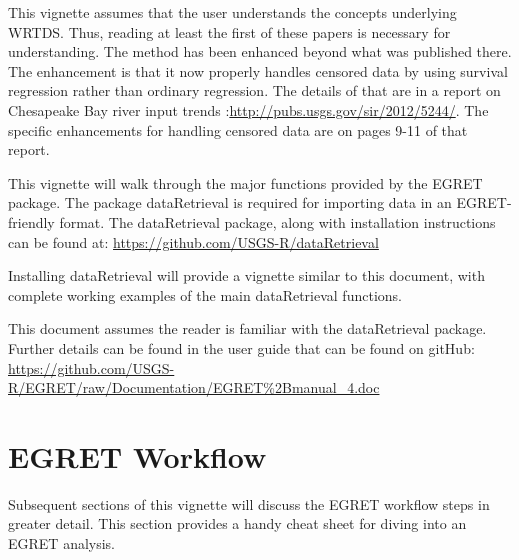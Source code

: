 \documentclass[a4paper,11pt]{article}\usepackage{graphicx, color}
\begin{document}
This vignette assumes that the user understands the concepts underlying WRTDS.  Thus, reading at least the first of these papers is necessary for understanding.  The method has been enhanced beyond what was published there.  The enhancement is that it now properly handles censored data by using survival regression rather than ordinary regression.  The details of that are in a report on Chesapeake Bay river input trends \cite{HirschIV}:\url{http://pubs.usgs.gov/sir/2012/5244/}.  The specific enhancements for handling censored data are on pages 9-11 of that report.

This vignette will walk through the major functions provided by the EGRET package. The package dataRetrieval is required for importing data in an EGRET-friendly format. The dataRetrieval package, along with installation instructions can be found at:
\url{https://github.com/USGS-R/dataRetrieval}

Installing dataRetrieval will provide a vignette similar to this document, with complete working examples of the main dataRetrieval functions.

This document assumes the reader is familiar with the dataRetrieval package. Further details can be found in the user guide that can be found on gitHub: \url{https://github.com/USGS-R/EGRET/raw/Documentation/EGRET%2Bmanual_4.doc}

\section{EGRET Workflow}
Subsequent sections of this vignette will discuss the EGRET workflow steps in greater detail. This section provides a handy cheat sheet for diving into an EGRET analysis.
\end{document}
